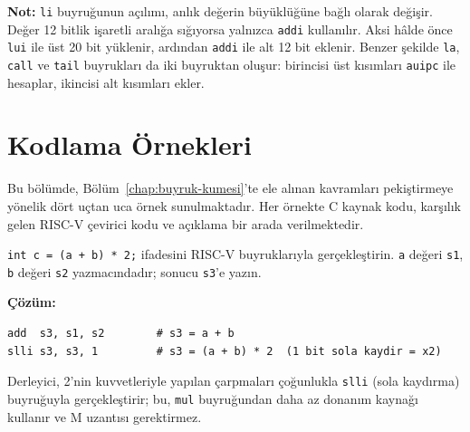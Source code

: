 \noindent
\textbf{Not:} \texttt{li} buyruğunun açılımı, anlık değerin büyüklüğüne bağlı olarak değişir. Değer 12 bitlik işaretli aralığa sığıyorsa yalnızca \texttt{addi} kullanılır. Aksi hâlde önce \texttt{lui} ile üst 20 bit yüklenir, ardından \texttt{addi} ile alt 12 bit eklenir. Benzer şekilde \texttt{la}, \texttt{call} ve \texttt{tail} buyrukları da iki buyruktan oluşur: birincisi üst kısımları \texttt{auipc} ile hesaplar, ikincisi alt kısımları ekler.


\section{Kodlama Örnekleri}
\label{sec:ekc-kodlama-ornekleri}

Bu bölümde, Bölüm~\ref{chap:buyruk-kumesi}'te ele alınan kavramları pekiştirmeye yönelik dört uçtan uca örnek sunulmaktadır. Her örnekte C kaynak kodu, karşılık gelen RISC-V çevirici kodu ve açıklama bir arada verilmektedir.

\begin{ornek}[C.1]
\label{orn:ekc-aritmetik}
\texttt{int c = (a + b) * 2;} ifadesini RISC-V buyruklarıyla gerçekleştirin. \texttt{a} değeri \texttt{s1}, \texttt{b} değeri \texttt{s2} yazmacındadır; sonucu \texttt{s3}'e yazın.

\textbf{Çözüm:}
\begin{lstlisting}[style=riscv]
add  s3, s1, s2        # s3 = a + b
slli s3, s3, 1         # s3 = (a + b) * 2  (1 bit sola kaydir = x2)
\end{lstlisting}

Derleyici, 2'nin kuvvetleriyle yapılan çarpmaları çoğunlukla \texttt{slli} (sola kaydırma) buyruğuyla gerçekleştirir; bu, \texttt{mul} buyruğundan daha az donanım kaynağı kullanır ve M uzantısı gerektirmez.
\end{ornek}

